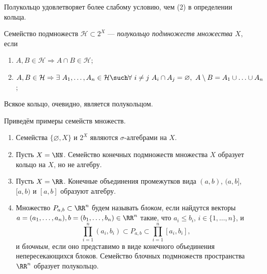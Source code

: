 Полукольцо удовлетворяет более слабому условию, чем (2) в определении кольца.
\begin{defin}
	Семейство подмножеств $\mathcal{H}\subset 2^X$ --- \textit{полукольцо подмножеств множества $X$}, если
	\begin{enumerate}
		\item $A,B\in\mathcal{H}\Rightarrow A\cap B\in\mathcal{H}$;
		\item $A,B\in\mathcal{H}\Rightarrow\exists\ A_1,\ldots,A_n\in\mathcal{H}\such \forall\ i\neq j\ A_i\cap A_j=\varnothing,\ A\setminus B=A_1\cup\ldots\cup A_n$;
	\end{enumerate}
\end{defin}
Всякое кольцо, очевидно, является полукольцом.

Приведём примеры семейств множеств.
\begin{enumerate}
	\item Семейства $\{\varnothing, X\}$ и $2^X$ являются $\sigma$-алгебрами на $X$.
	\item Пусть $X=\NN$. Семейство конечных подмножеств множества $X$ образует кольцо на $X$, но не алгебру.
	\item Пусть $X=\RR$. Конечные объединения промежутков вида $(a,b)$, $(a,b]$, $[a,b)$ и $[a,b]$ образуют алгебру.
	\item Множество $P_{a,b}\subset\RR^n$ будем называть \textit{блоком}, если найдутся векторы $a=(a_1,\ldots,a_n),b=(b_1,\ldots,b_n)\in\RR^n$ такие, что $a_i\leqslant b_i$, $i\in\{1,\ldots,n\}$, и
		\begin{equation*}
			\prod_{i=1}^n (a_i,b_i)\subset P_{a,b}\subset\prod_{i=1}^n [a_i,b_i],
		\end{equation*}
		и \textit{блочным}, если оно представимо в виде конечного объединения непересекающихся блоков. Семейство блочных подмножеств пространства $\RR^n$ образует полукольцо\label{itm:block}.
\end{enumerate}

